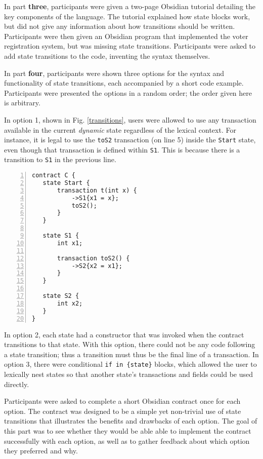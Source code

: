 \documentclass[sigplan,10pt,review]{acmart}\settopmatter{printfolios=true}
\begin{document}
In part \textbf{three}, participants were given a two-page Obsidian tutorial detailing the key components of the language. 
The tutorial explained how state blocks work, but did not give any information about how transitions should be 
written. Participants were then given an Obsidian program that implemented the voter registration system, but was 
missing state transitions. Participants were asked to add state transitions to the code, inventing the syntax 
themselves.

In part \textbf{four}, participants were shown three options for the syntax and functionality of state transitions, each 
accompanied by a short code example. Participants were presented the options in a random order; the order given 
here is arbitrary.

In option 1, shown in Fig. \ref{transitions}, users were allowed to use any transaction available in the current \textit{dynamic} state regardless of the lexical context. For instance, it is legal to use the \texttt{\small{toS2}} transaction (on line 5) inside the \texttt{\small{Start}} 
state, even though that transaction is defined within \texttt{\small{S1}}. This is because there is a transition to 
\texttt{\small{S1}} in the previous line.


\begin{lstlisting}[caption={Option 1 for state transitions},captionpos=b, label=transitions, numbers=left, xleftmargin=.5cm]
contract C {
   state Start {
       transaction t(int x) {
           ->S1{x1 = x};
           toS2();
       }
   }

   state S1 {
       int x1;

       transaction toS2() {
           ->S2{x2 = x1};
       }
   }

   state S2 {
       int x2;
   }
}
\end{lstlisting}

In option 2, each state had a constructor that was invoked when the contract transitions to that state. With this
option, there could not be any code following a state transition; thus a transition must thus be the final line of a 
transaction. In option 3, there were conditional \texttt{\small{if in \{state\}}} blocks, which allowed the user
to lexically nest states so that another state's transactions and fields could be used directly. 

Participants were asked to complete a short Obsidian contract once for each option. The contract was 
designed to be a simple yet non-trivial use of state transitions that illustrates the benefits and drawbacks of each 
option. The goal of this part was to see whether they would be able able to implement the 
contract successfully with each option, as well as to gather feedback about which option they preferred and why.
\end{document}
